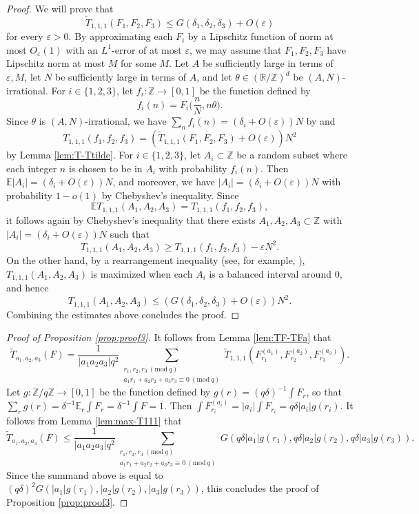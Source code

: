 \documentclass[12pt, notitlepage]{amsart}
\numberwithin{equation}{section}
\def\R{\mathbb R}
\def\Z{\mathbb Z}
\def\E{\mathbb E}
\def\wt{\widetilde}
\newcommand{\eps}{\varepsilon}
\newcommand{\Mod}[1]{\ (\mathrm{mod}\ #1)}
\theoremstyle{remark}
\theoremstyle{definition}
\theoremstyle{remark}
\numberwithin{equation}{section}
\begin{document}
\begin{proof}
We will prove that 
$$
\wt{T}_{1,1,1}(F_1, F_2, F_3) \leq G(\delta_1, \delta_2, \delta_3) + O(\eps)
$$
for every $\eps > 0$. By approximating each $F_i$ by a Lipschitz function of norm at most $O_{\eps}(1)$ with an $L^1$-error of at most $\eps$, we may assume that $F_1,F_2,F_3$ have Lipschitz norm at most $M$ for some $M$. Let $A$ be sufficiently large in terms of $\eps,M$, let $N$ be sufficiently large in terms of $A$, and let $\theta \in (\R/\Z)^d$ be $(A,N)$-irrational. For $i \in \{1,2,3\}$, let $f_i: \Z\rightarrow [0,1]$ be the function defined by
$$
f_i(n) = F_i\Big(\frac{n}{N}, n\theta\Big).
$$
Since $\theta$ is $(A,N)$-irrational, we have $\sum_n f_i(n) = (\delta_i + O(\eps))N$ by \cite[Lemma A.4]{EberhardGreenManners} and
$$
T_{1,1,1}(f_1,f_2, f_3)  = (\wt{T}_{1,1,1}(F_1,F_2,F_3) + O(\eps))N^2
$$
by Lemma \ref{lem:T-Ttilde}. For $i\in \{1,2,3\}$, let $A_i \subset \Z$ be a random subset where each integer $n$ is chosen to be in $A_i$ with probability $f_i(n)$. Then $\E |A_i| = (\delta_i + O(\eps))N$, and moreover, we have $|A_i| = (\delta_i + O(\eps))N$ with probability $1-o(1)$ by Chebyshev's inequality. Since
$$
\E T_{1,1,1}(A_1,A_2,A_3) = T_{1,1,1}(f_1,f_2,f_3),
$$
it follows again by Chebyshev's inequality that there exists $A_1,A_2,A_3 \subset \Z$ with $|A_i| = (\delta_i + O(\eps))N$ such that
$$
T_{1,1,1}(A_1,A_2,A_3) \geq T_{1,1,1}(f_1,f_2,f_3) - \eps N^2.
$$
On the other hand, by a rearrangement inequality (see, for example, \cite[Theorem 1]{lev1998number}), $T_{1,1,1}(A_1,A_2,A_3)$ is maximized when each $A_i$ is a balanced interval around $0$, and hence
$$
T_{1,1,1}(A_1,A_2,A_3) \leq  (G(\delta_1,\delta_2,\delta_3) + O(\eps))N^2.
$$
Combining the estimates above concludes the proof.
\end{proof}

\begin{proof}[Proof of Proposition \ref{prop:proof3}]
It follows from Lemma \ref{lem:TF-TFa} that
$$
\wt{T}_{a_1,a_2,a_3}(F) = \frac{1}{|a_1a_2a_3|q^2} \sum_{\substack{r_1,r_2,r_3\Mod{q} \\ a_1r_1+a_2r_2+a_3r_3\equiv 0\Mod{q}}}  \wt{T}_{1,1,1}(F_{r_1}^{(a_1)}, F_{r_2}^{(a_2)}, F_{r_3}^{(a_3)}).
$$
Let $g:\Z/q\Z \rightarrow [0,1]$ be the function defined by $g(r) = (q\delta)^{-1}\int F_r$, so that $\sum_r g(r) = \delta^{-1}\E_r \int F_r = \delta^{-1}\int F = 1$. Then $\int F_{r_i}^{(a_i)} = |a_i| \int F_{r_i} = q\delta |a_i|g(r_i)$. It follows from Lemma \ref{lem:max-T111} that
$$
\wt{T}_{a_1,a_2,a_3}(F) \leq \frac{1}{|a_1a_2a_3|q^2} \sum_{\substack{r_1,r_2,r_3\Mod{q} \\ a_1r_1+a_2r_2+a_3r_3\equiv 0\Mod{q}}} G(q\delta |a_1|g(r_1), q\delta |a_2|g(r_2), q\delta |a_3|g(r_3)).
$$
Since the summand above is equal to $(q\delta)^2 G(|a_1|g(r_1), |a_2|g(r_2), |a_3|g(r_3))$, this concludes the proof of Proposition \ref{prop:proof3}.
\end{proof}
\end{document}
